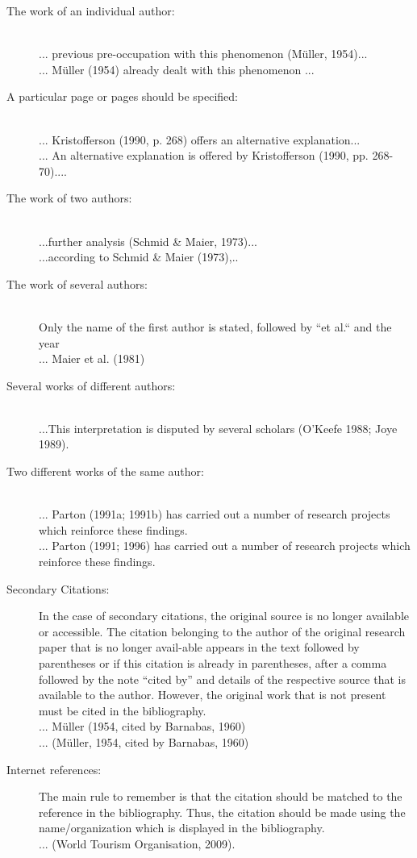\begin{description}
	\item[The work of an individual author:]\hfill \\
	... previous pre-occupation with this phenomenon (Müller, 1954)...\hfill \\
	... Müller (1954) already dealt with this phenomenon ...
%
	\item[A particular page or pages should be specified:]\hfill \\
	... Kristofferson (1990, p. 268) offers an alternative explanation...\hfill \\
	... An alternative explanation is offered by Kristofferson (1990, pp. 268-70)....
%
	\item[The work of two authors:]\hfill \\
	...further analysis (Schmid \& Maier, 1973)...\hfill \\
	...according to Schmid \& Maier (1973),..
%
	\item[The work of several authors:]\hfill \\
	Only the name of the first author is stated, followed by “et al.“ and the year\hfill \\
	... Maier et al. (1981)
%	
	\item[Several works of different authors:]\hfill \\
	...This interpretation is disputed by several scholars (O’Keefe 1988; Joye 1989).
%
	\item[Two different works of the same author:]\hfill \\
	... Parton (1991a; 1991b) has carried out a number of research projects which reinforce these findings. \hfill \\
	... Parton (1991; 1996) has carried out a number of research projects which reinforce these findings.
%
	\item[Secondary Citations:] In the case of secondary citations, the original source is no longer available or accessible. The citation belonging to the author of the original research paper that is no longer avail-able appears in the text followed by parentheses or if this citation is already in parentheses, after a comma followed by the note “cited by” and details of the respective source that is available to the author. However, the original work that is not present must be cited in the bibliography.\hfill \\
... Müller (1954, cited by Barnabas, 1960) \hfill \\
... (Müller, 1954, cited by Barnabas, 1960)
%
	\item[Internet references:] The main rule to remember is that the citation should be matched to the reference in the bibliography. Thus, the citation should be made using the name/organization which is displayed in the bibliography.\hfill \\ ... (World Tourism Organisation, 2009). 
\end{description}

